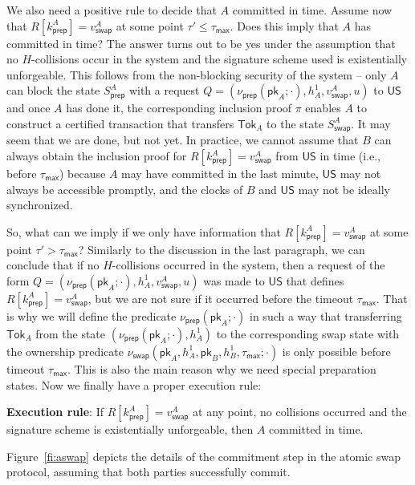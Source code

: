 \documentclass{article}
\newcommand{\pubkey}[0]{\mathsf{pk}}
\newcommand{\unisrv}[0]{\mathsf{US}}
\begin{document}
\noindent We also need a positive rule to decide that $A$ committed in time. Assume now that $R[k^A_\mathsf{prep}]=v^A_\mathsf{swap}$ at some point $\tau'\le \tau_\mathsf{max}$.
Does this imply that $A$ has committed in time?
The answer turns out to be yes under the assumption that no $H$-collisions occur in the system and the signature scheme used is existentially unforgeable. This follows from the non-blocking security of the system -- only $A$ can block the state $S^A_\mathsf{prep}$ with a request $Q=(\nu_\mathsf{prep}(\pubkey_A;\cdot), h^1_A,v^A_\mathsf{swap},u)$ to $\unisrv$ and once $A$ has done it, the corresponding inclusion proof $\pi$ enables $A$ to construct a certified transaction that transfers $\mathsf{Tok}_A$ to the state $S^A_\mathsf{swap}$. It may seem that we are done, but not yet. In practice, we cannot assume that $B$ can always obtain the inclusion proof for $R[k^A_\mathsf{prep}]=v^A_\mathsf{swap}$ from $\unisrv$ in time (i.e., before $\tau_\mathsf{max}$) because $A$ may have committed in the last minute, $\unisrv$ may not always be accessible promptly, and the clocks of $B$ and $\unisrv$ may not be ideally synchronized. \medskip

\noindent So, what can we imply if we only have information that $R[k^A_\mathsf{prep}]=v^A_\mathsf{swap}$ at some point $\tau'> \tau_\mathsf{max}$? Similarly to the discussion in the last paragraph, we can conclude that if no $H$-collisions occurred in the system, then a request of the form $Q=(\nu_\mathsf{prep}(\pubkey_A;\cdot), h^1_A,v^A_\mathsf{swap},u)$ was made to $\unisrv$ that defines $R[k^A_\mathsf{prep}]=v^A_\mathsf{swap}$, but we are not sure if it occurred before the timeout $\tau_\mathsf{max}$. That is why we will define the predicate $\nu_\mathsf{prep}(\pubkey_A;\cdot)$ in such a way that transferring $\mathsf{Tok}_A$ from the state $(\nu_\mathsf{prep}(\pubkey_A;\cdot), h^1_A)$ to the corresponding swap state with the ownership predicate $\nu_\mathsf{swap}(\pubkey_A,h^1_A,\pubkey_B,h^1_B,\tau_\mathsf{max};\cdot)$ is only possible before timeout $\tau_\mathsf{max}$. This is also the main reason why we need special preparation states. Now we finally have a proper execution rule:\medskip

\noindent \textbf{Execution rule}: If
$R[k^A_\mathsf{prep}]=v^A_\mathsf{swap}$ at any point, no collisions occurred and the signature scheme is existentially unforgeable, then $A$ committed in time.
\medskip

\noindent Figure~\ref{fi:aswap} depicts the details of the commitment step in the atomic swap protocol, assuming that both parties successfully commit.
\end{document}
